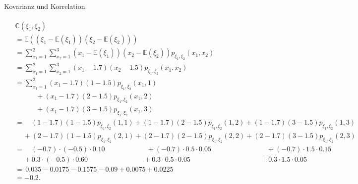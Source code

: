 \documentclass[
  8pt,
  ignorenonframetext,
]{beamer}
\begin{document}
\begin{frame}{Kovarianz und Korrelation}
\protect\hypertarget{kovarianz-und-korrelation-2}{}
\begin{tiny}
\begin{align*}
\begin{split}
& \mathbb{C}(\xi_1,\xi_2)                                                                                       \\
& = \mathbb{E}((\xi_1 - \mathbb{E}(\xi_1))(\xi_2 - \mathbb{E}(\xi_2)))                                              \\
& = \sum_{x_1 = 1}^2 \sum_{x_2 = 1}^3 (x_1 - \mathbb{E}(\xi_1))(x_2 - \mathbb{E}(\xi_2))p_{\xi_1,\xi_2}(x_1,x_2)    \\
& = \sum_{x_1 = 1}^2 \sum_{x_2 = 1}^3 (x_1 - 1.7)(x_2 - 1.5)p_{\xi_1,\xi_2}(x_1,x_2)                            \\
& = \sum_{x_1 = 1}^2    (x_1 - 1.7)(1 - 1.5)p_{\xi_1,\xi_2}(x_1,1)                                              \\
&   \quad\quad\quad  +  (x_1 - 1.7)(2 - 1.5)p_{\xi_1,\xi_2}(x_1,2)                                              \\
&   \quad\quad\quad  +  (x_1 - 1.7)(3 - 1.5)p_{\xi_1,\xi_2}(x_1,3)                                              \\
& = \quad       (1 - 1.7)(1 - 1.5)p_{\xi_1,\xi_2}(1,1)
            +   (1 - 1.7)(2 - 1.5)p_{\xi_1,\xi_2}(1,2)
            +   (1 - 1.7)(3 - 1.5)p_{\xi_1,\xi_2}(1,3)                                                          \\
& \quad\,   +   (2 - 1.7)(1 - 1.5)p_{\xi_1,\xi_2}(2,1)
            +   (2 - 1.7)(2 - 1.5)p_{\xi_1,\xi_2}(2,2)
            +   (2 - 1.7)(3 - 1.5)p_{\xi_1,\xi_2}(2,3)                                                          \\
& = \quad       (-0.7)\cdot (-0.5) \cdot 0.10   \quad\quad\quad\quad\quad\quad
            +   (-0.7)\cdot   0.5  \cdot 0.05   \quad\quad\quad\quad\quad\quad\quad\quad
            +   (-0.7)\cdot   1.5  \cdot 0.15                                                               \\
& \quad\,   +   0.3   \cdot (-0.5) \cdot 0.60   \quad\quad\quad\quad\quad\quad\quad\quad
            +   0.3   \cdot   0.5  \cdot 0.05   \quad\quad\quad\quad\quad\quad\quad\quad\quad\quad
            +   0.3   \cdot   1.5  \cdot 0.05                                                               \\
& = \,    0.035
        - 0.0175
        - 0.1575
        - 0.09
        + 0.0075
        + 0.0225\\
& = - 0.2.
\end{split}
\end{align*}
\end{tiny}
\end{frame}
\end{document}
